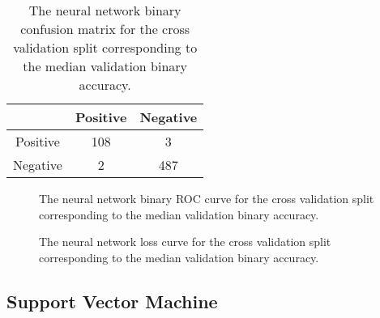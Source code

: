 \documentclass[twocolumn]{article}
\begin{document}
\begin{table}
\begin{center}
\begin{tabular}{ccc}
\toprule
& Positive & Negative \\
\midrule
Positive & 108 & 3 \\
Negative & 2 & 487 \\
\bottomrule
\end{tabular}
\end{center}
\caption{The neural network binary confusion matrix for the cross validation
  split corresponding to the median validation binary accuracy.}
\label{tab:NeuralNetworkConfusionMatrix}
\end{table}

\begin{figure}
\begin{center}
\end{center}
\caption{The neural network binary ROC curve for the cross validation split
  corresponding to the median validation binary accuracy.}
\label{fig:NeuralNetworkROC}
\end{figure}

\begin{figure}
\begin{center}
\end{center}
\caption{The neural network loss curve for the cross validation split
  corresponding to the median validation binary accuracy.}
\label{fig:NeuralNetworkLoss}
\end{figure}

\subsection{Support Vector Machine}
\end{document}
